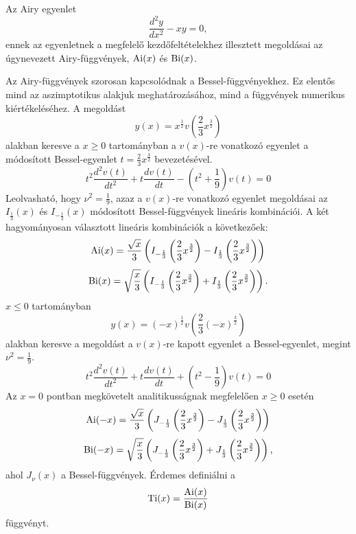 Az Airy egyenlet
\begin{equation}
	\frac{d^2y}{dx^2} - xy = 0,
	\label{airy:airyeq}
\end{equation}
ennek az egyenletnek a megfelelő kezdőfeltételekhez illesztett megoldásai az úgynevezett Airy-függvények, $\mathrm{Ai}(x)$ és $\mathrm{Bi}(x)$.

Az Airy-függvények szorosan kapcsolódnak a Bessel-függvényekhez. Ez elentős mind az aszimptotikus alakjuk meghatározásához, mind a függvények numerikus kiértékeléséhez. A megoldást
\begin{equation}
	y(x) = x^{\frac{1}{2}}v\left(\frac{2}{3}x^{\frac{3}{2}}\right)
\end{equation}
alakban keresve a $x \geq 0$ tartományban a $v(x)$-re vonatkozó egyenlet a módosított Bessel-egyenlet $t=\frac{2}{3}x^{\frac{3}{2}}$ bevezetésével.
\begin{equation}
	t^2\frac{d^2v(t)}{dt^2} + t\frac{dv(t)}{dt} - \left(t^2 + \frac{1}{9}\right)v(t) = 0
\end{equation}
Leolvasható, hogy $\nu^2 = \frac{1}{9}$, azaz a $v(x)$-re vonatkozó egyenlet megoldásai az $I_{\frac{1}{3}}(x)$ és $I_{-\frac{1}{3}}(x)$ módosított Bessel-függvények lineáris kombinációi.
A két hagyományosan választott lineáris kombinációk a következőek:
\begin{equation}
	\mathrm{Ai}(x) = \frac{\sqrt{x}}{3}\left(I_{-\frac{1}{3}}\left(\frac{2}{3}x^{\frac{3}{2}}\right)-I_{\frac{1}{3}}\left(\frac{2}{3}x^{\frac{3}{2}}\right)\right)
	\label{airy:ai+}
\end{equation}
\begin{equation}
	\mathrm{Bi}(x) = \sqrt{\frac{x}{3}}\left(I_{-\frac{1}{3}}\left(\frac{2}{3}x^{\frac{3}{2}}\right)+I_{\frac{1}{3}}\left(\frac{2}{3}x^{\frac{3}{2}}\right)\right).
	\label{airy:ai+}
\end{equation}
$x \leq 0$ tartományban
\begin{equation}
	y(x) = (-x)^{\frac{1}{2}}v\left(\frac{2}{3}(-x)^{\frac{3}{2}}\right)
\end{equation}
alakban keresve a megoldást a $v(x)$-re kapott egyenlet a Bessel-egyenlet, megint $\nu^2 = \frac{1}{9}$.
\begin{equation}
	t^2\frac{d^2v(t)}{dt^2} + t\frac{dv(t)}{dt} + \left(t^2 - \frac{1}{9}\right)v(t) = 0
\end{equation}
Az $x=0$ pontban megkövetelt analitikusságnak megfelelően $x \geq 0$ esetén
\begin{equation}
	\mathrm{Ai}(-x) = \frac{\sqrt{x}}{3}\left(J_{-\frac{1}{3}}\left(\frac{2}{3}x^{\frac{3}{2}}\right)-J_{\frac{1}{3}}\left(\frac{2}{3}x^{\frac{3}{2}}\right)\right)
	\label{airy:ai-}
\end{equation}
\begin{equation}
	\mathrm{Bi}(-x) = \sqrt{\frac{x}{3}}\left(J_{-\frac{1}{3}}\left(\frac{2}{3}x^{\frac{3}{2}}\right)+J_{\frac{1}{3}}\left(\frac{2}{3}x^{\frac{3}{2}}\right)\right),
	\label{airy:bi-}
\end{equation}
ahol $J_\nu(x)$ a Bessel-függvények. Érdemes definiálni a
\begin{equation}
	\mathrm{Ti}(x) = \frac{\mathrm{Ai}(x)}{\mathrm{Bi}(x)}
\end{equation}
függvényt.

